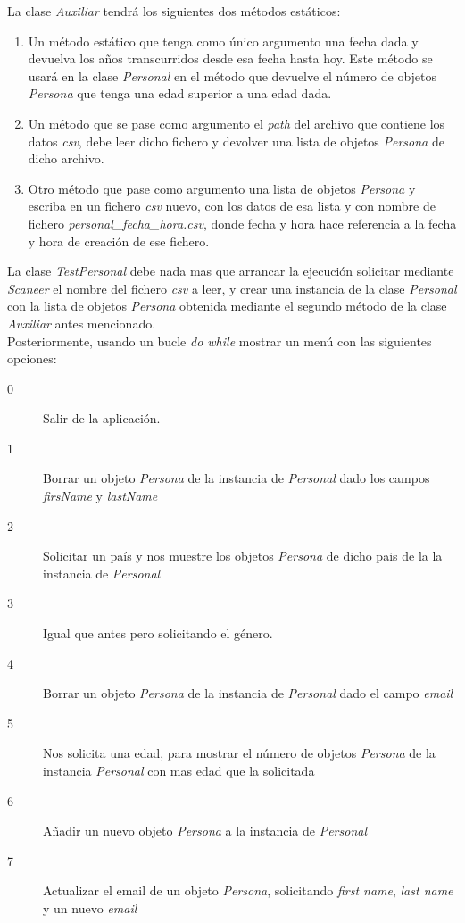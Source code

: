 \documentclass[4paper]{article}
\begin{document}
La clase \emph{Auxiliar} tendrá los siguientes dos métodos estáticos:
\begin{enumerate}
\item Un método estático que tenga como único argumento una fecha dada y devuelva los años transcurridos desde esa fecha hasta hoy. Este método se usará en la clase \emph{Personal} en el método que devuelve el número de objetos \emph{Persona} que tenga una edad superior a una edad dada.
\item Un método que se pase como argumento el \emph{path} del archivo que contiene los datos \emph{csv}, debe leer dicho fichero y devolver una lista de objetos \emph{Persona} de dicho archivo.
\item Otro método que pase como argumento una lista de objetos \emph{Persona} y escriba en un fichero \emph{csv} nuevo, con los datos de esa lista y con nombre de fichero \emph{personal\_fecha\_hora.csv}, donde fecha y hora hace referencia a la fecha y hora de creación de ese fichero.
\end{enumerate}
La clase \emph{TestPersonal} debe nada mas que arrancar la ejecución solicitar mediante \emph{Scaneer} el nombre del fichero \emph{csv} a leer, y crear una instancia de la clase \emph{Personal} con la lista de objetos \emph{Persona} obtenida mediante el segundo método de la clase \emph{Auxiliar} antes mencionado.\\
Posteriormente, usando un bucle \emph{do while} mostrar un menú con las siguientes opciones:
\begin{description}
\item[0] Salir de la aplicación.
\item[1] Borrar un objeto \emph{Persona} de la instancia de \emph{Personal} dado los campos \emph{firsName} y \emph{lastName}
\item[2] Solicitar un país y nos muestre los objetos \emph{Persona} de dicho pais de la la instancia de \emph{Personal}
\item[3] Igual que antes pero solicitando el género.
\item[4] Borrar un objeto \emph{Persona} de la instancia de \emph{Personal} dado el campo \emph{email}
\item[5] Nos solicita una edad, para mostrar el número de objetos \emph{Persona} de la instancia \emph{Personal} con mas edad que la solicitada
\item[6] Añadir un nuevo objeto \emph{Persona} a la instancia de \emph{Personal}
\item[7] Actualizar el email de un objeto \emph{Persona}, solicitando \emph{first name}, \emph{last name} y un nuevo \emph{email}
\end{description}
\end{document}
